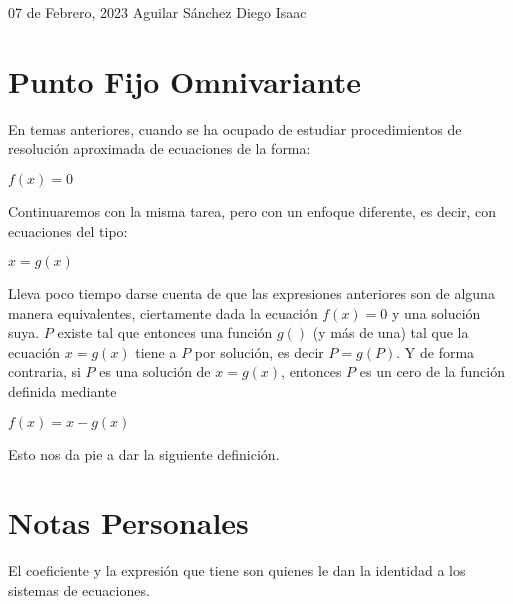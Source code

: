 \documentclass[12pt]{article}
\begin{document}
\begin{flushright}
    07 de Febrero, 2023 \linebreak
    Aguilar Sánchez Diego Isaac
\end{flushright}
\section*{Punto Fijo Omnivariante}
En temas anteriores, cuando se ha ocupado de estudiar procedimientos de resolución aproximada de ecuaciones de la forma:
\begin{center}
    $f(x) = 0$
\end{center}
Continuaremos con la misma tarea, pero con un enfoque diferente, es decir, con ecuaciones del tipo:
\begin{center}
    $x = g(x)$
\end{center}
Lleva poco tiempo darse cuenta de que las expresiones anteriores son de alguna manera equivalentes, ciertamente dada la ecuación $f(x) = 0$ y una solución suya. $P$ existe tal que entonces una función $g()$ (y más de una) tal que la ecuación $x = g(x)$ tiene a $P$ por solución, es decir $P = g(P)$. Y de forma contraria, si $P$ es una solución de $x = g(x)$, entonces $P$ es un cero de la función definida mediante
\begin{center}
    $f(x) = x - g(x)$
\end{center}
Esto nos da pie a dar la siguiente definición.
\section*{Notas Personales}
El coeficiente y la expresión que tiene son quienes le dan la identidad a los sistemas de ecuaciones.
\end{document}
